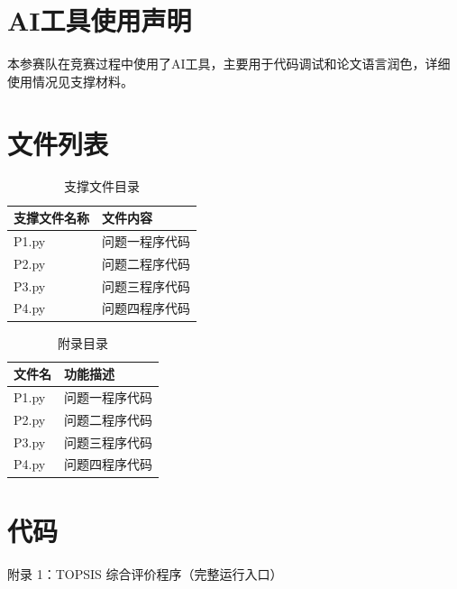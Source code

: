 \documentclass[withoutpreface,bwprint]{cumcmthesis}
\begin{document}

\section{AI工具使用声明}

本参赛队在竞赛过程中使用了AI工具，主要用于代码调试和论文语言润色，详细使用情况见支撑材料。

\nocite{*}

\newpage
\begin{appendices}
\setcounter{table}{0}
\renewcommand{\thetable}{\arabic{table}}
    
\section{文件列表}

\begin{table}[H]
\centering
\caption{支撑文件目录}
\begin{tabularx}{0.98\textwidth}{@{}>{\centering\arraybackslash}p{} >{\centering\arraybackslash}p{}@{}}
\toprule
支撑文件名称   & 文件内容 \\
\midrule
P1.py & 问题一程序代码 \\
P2.py & 问题二程序代码 \\
P3.py & 问题三程序代码 \\
P4.py & 问题四程序代码 \\
\bottomrule
\end{tabularx}
\label{tab:支撑文件目录}
\end{table}

\vspace{0.8em}

\begin{table}[H]
\centering
\caption{附录目录}
\begin{tabularx}{0.98\textwidth}{@{}>{\centering\arraybackslash}p{} >{\centering\arraybackslash}p{}@{}}
\toprule
文件名   & 功能描述 \\
\midrule
P1.py & 问题一程序代码 \\
P2.py & 问题二程序代码 \\
P3.py & 问题三程序代码 \\
P4.py & 问题四程序代码 \\
\bottomrule
\end{tabularx}
\label{tab:附录目录}
\end{table}

\section{代码}

\noindent\normalsize 附录 1：TOPSIS 综合评价程序（完整运行入口）\par


\begin{appendixcodebox}

\end{appendixcodebox}

\end{appendices}
\end{document}

